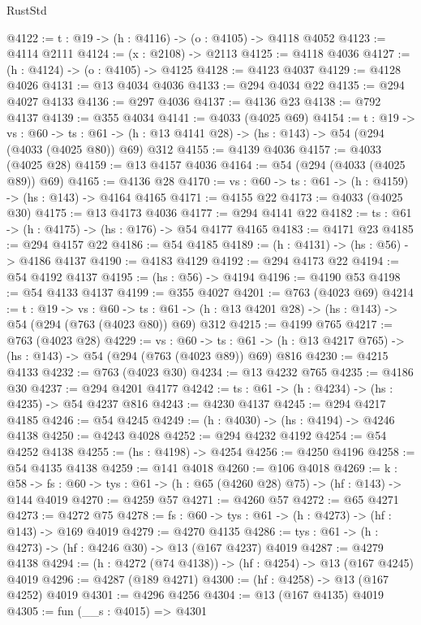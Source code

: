 \begin{lexlean}{RustStd}
\begin{coremodule}
@4122 := {t : @19} -> (h : @4116) -> (o : @4105) -> @4118 @4052
@4123 := @4114 @2111
@4124 := (x : @2108) -> @2113
@4125 := @4118 @4036
@4127 := (h : @4124) -> (o : @4105) -> @4125
@4128 := @4123 @4037
@4129 := @4128 @4026
@4131 := @13 @4034 @4036
@4133 := @294 @4034 @22
@4135 := @294 @4027 @4133
@4136 := @297 @4036
@4137 := @4136 @23
@4138 := @792 @4137
@4139 := @355 @4034
@4141 := @4033 (@4025 @69)
@4154 := {t : @19} ->
  {vs : @60} ->
  {ts : @61} -> (h : @13 @4141 @28) -> (hs : @143) -> @54 (@294 (@4033 (@4025 @80)) @69) @312
@4155 := @4139 @4036
@4157 := @4033 (@4025 @28)
@4159 := @13 @4157 @4036
@4164 := @54 (@294 (@4033 (@4025 @89)) @69)
@4165 := @4136 @28
@4170 := {vs : @60} -> {ts : @61} -> (h : @4159) -> (hs : @143) -> @4164 @4165
@4171 := @4155 @22
@4173 := @4033 (@4025 @30)
@4175 := @13 @4173 @4036
@4177 := @294 @4141 @22
@4182 := {ts : @61} -> (h : @4175) -> (hs : @176) -> @54 @4177 @4165
@4183 := @4171 @23
@4185 := @294 @4157 @22
@4186 := @54 @4185
@4189 := (h : @4131) -> (hs : @56) -> @4186 @4137
@4190 := @4183 @4129
@4192 := @294 @4173 @22
@4194 := @54 @4192 @4137
@4195 := (hs : @56) -> @4194
@4196 := @4190 @53
@4198 := @54 @4133 @4137
@4199 := @355 @4027
@4201 := @763 (@4023 @69)
@4214 := {t : @19} ->
  {vs : @60} ->
  {ts : @61} -> (h : @13 @4201 @28) -> (hs : @143) -> @54 (@294 (@763 (@4023 @80)) @69) @312
@4215 := @4199 @765
@4217 := @763 (@4023 @28)
@4229 := {vs : @60} ->
  {ts : @61} -> (h : @13 @4217 @765) -> (hs : @143) -> @54 (@294 (@763 (@4023 @89)) @69) @816
@4230 := @4215 @4133
@4232 := @763 (@4023 @30)
@4234 := @13 @4232 @765
@4235 := @4186 @30
@4237 := @294 @4201 @4177
@4242 := {ts : @61} -> (h : @4234) -> (hs : @4235) -> @54 @4237 @816
@4243 := @4230 @4137
@4245 := @294 @4217 @4185
@4246 := @54 @4245
@4249 := (h : @4030) -> (hs : @4194) -> @4246 @4138
@4250 := @4243 @4028
@4252 := @294 @4232 @4192
@4254 := @54 @4252 @4138
@4255 := (hs : @4198) -> @4254
@4256 := @4250 @4196
@4258 := @54 @4135 @4138
@4259 := @141 @4018
@4260 := @106 @4018
@4269 := {k : @58} ->
  {fs : @60} -> {tys : @61} -> (h : @65 (@4260 @28) @75) -> (hf : @143) -> @144 @4019
@4270 := @4259 @57
@4271 := @4260 @57
@4272 := @65 @4271
@4273 := @4272 @75
@4278 := {fs : @60} -> {tys : @61} -> (h : @4273) -> (hf : @143) -> @169 @4019
@4279 := @4270 @4135
@4286 := {tys : @61} -> (h : @4273) -> (hf : @4246 @30) -> @13 (@167 @4237) @4019
@4287 := @4279 @4138
@4294 := (h : @4272 (@74 @4138)) -> (hf : @4254) -> @13 (@167 @4245) @4019
@4296 := @4287 (@189 @4271)
@4300 := (hf : @4258) -> @13 (@167 @4252) @4019
@4301 := @4296 @4256
@4304 := @13 (@167 @4135) @4019
@4305 := fun (__s : @4015) => @4301

\end{coremodule}
\end{lexlean}
